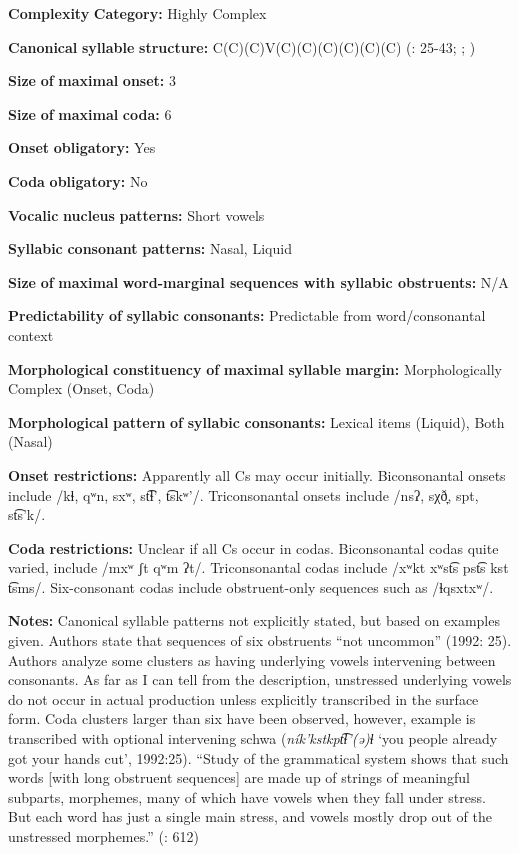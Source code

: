 \textbf{Complexity} \textbf{Category:} Highly Complex

\textbf{Canonical} \textbf{syllable} \textbf{structure:} C(C)(C)V(C)(C)(C)(C)(C)(C) (\citealt{ThompsonThompson1992}: 25-43; \citealt{ThompsonThompson1996}; \citealt{ThompsonEtAl1996})

\textbf{Size} \textbf{of} \textbf{maximal} \textbf{onset:} 3

\textbf{Size} \textbf{of} \textbf{maximal} \textbf{coda:} 6

\textbf{Onset} \textbf{obligatory:} Yes

\textbf{Coda} \textbf{obligatory:} No

\textbf{Vocalic} \textbf{nucleus} \textbf{patterns:} Short vowels

\textbf{Syllabic} \textbf{consonant} \textbf{patterns:} Nasal, Liquid

\textbf{Size} \textbf{of} \textbf{maximal} \textbf{word{}-marginal sequences with syllabic obstruents:} N/A

\textbf{Predictability} \textbf{of} \textbf{syllabic} \textbf{consonants:} Predictable from word/consonantal context

\textbf{Morphological} \textbf{constituency} \textbf{of} \textbf{maximal} \textbf{syllable} \textbf{margin:} Morphologically Complex (Onset, Coda)

\textbf{Morphological} \textbf{pattern} \textbf{of} \textbf{syllabic} \textbf{consonants:} Lexical items (Liquid), Both (Nasal)

\textbf{Onset} \textbf{restrictions:} Apparently all Cs may occur initially. Biconsonantal onsets include /kɬ, qʷn, sxʷ, st͡ɬ’, t͡skʷ’/. Triconsonantal onsets include /nsʔ, sχð̞, spt, st͡s’k/.

\textbf{Coda} \textbf{restrictions:} Unclear if all Cs occur in codas. Biconsonantal codas quite varied, include /mxʷ ʃt qʷm ʔt/. Triconsonantal codas include /xʷkt xʷst͡s pst͡s kst t͡sms/. Six-consonant codas include obstruent-only sequences such as /ɬqsxtxʷ/.

\textbf{Notes:} Canonical syllable patterns not explicitly stated, but based on examples given. Authors state that sequences of six obstruents “not uncommon” (1992: 25). Authors analyze some clusters as having underlying vowels intervening between consonants. As far as I can tell from the description, unstressed underlying vowels do not occur in actual production unless explicitly transcribed in the surface form. Coda clusters larger than six have been observed, however, example is transcribed with optional intervening schwa (\textit{ník’kstkpt͡ɬ’(ə)ɬ} ‘you people already got your hands cut’, 1992:25). “Study of the grammatical system shows that such words [with long obstruent sequences] are made up of strings of meaningful subparts, morphemes, many of which have vowels when they fall under stress. But each word has just a single main stress, and vowels mostly drop out of the unstressed morphemes.” (\citealt{ThompsonEtAl1996}: 612)

